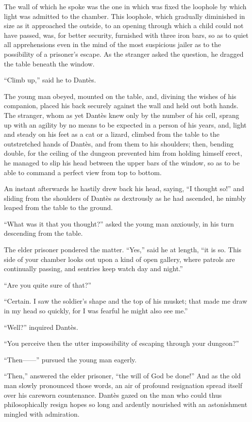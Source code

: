 The wall of which he spoke was the one in which was fixed the loophole
by which light was admitted to the chamber. This loophole, which
gradually diminished in size as it approached the outside, to an
opening through which a child could not have passed, was, for better
security, furnished with three iron bars, so as to quiet all
apprehensions even in the mind of the most suspicious jailer as to the
possibility of a prisoner’s escape. As the stranger asked the question,
he dragged the table beneath the window.

“Climb up,” said he to Dantès.

The young man obeyed, mounted on the table, and, divining the wishes of
his companion, placed his back securely against the wall and held out
both hands. The stranger, whom as yet Dantès knew only by the number of
his cell, sprang up with an agility by no means to be expected in a
person of his years, and, light and steady on his feet as a cat or a
lizard, climbed from the table to the outstretched hands of Dantès, and
from them to his shoulders; then, bending double, for the ceiling of
the dungeon prevented him from holding himself erect, he managed to
slip his head between the upper bars of the window, so as to be able to
command a perfect view from top to bottom.

An instant afterwards he hastily drew back his head, saying, “I thought
so!” and sliding from the shoulders of Dantès as dextrously as he had
ascended, he nimbly leaped from the table to the ground.

“What was it that you thought?” asked the young man anxiously, in his
turn descending from the table.

The elder prisoner pondered the matter. “Yes,” said he at length, “it
is so. This side of your chamber looks out upon a kind of open gallery,
where patrols are continually passing, and sentries keep watch day and
night.”

“Are you quite sure of that?”

“Certain. I saw the soldier’s shape and the top of his musket; that
made me draw in my head so quickly, for I was fearful he might also see
me.”

“Well?” inquired Dantès.

“You perceive then the utter impossibility of escaping through your
dungeon?”

“Then——” pursued the young man eagerly.

“Then,” answered the elder prisoner, “the will of God be done!” And as
the old man slowly pronounced those words, an air of profound
resignation spread itself over his careworn countenance. Dantès gazed
on the man who could thus philosophically resign hopes so long and
ardently nourished with an astonishment mingled with admiration.

